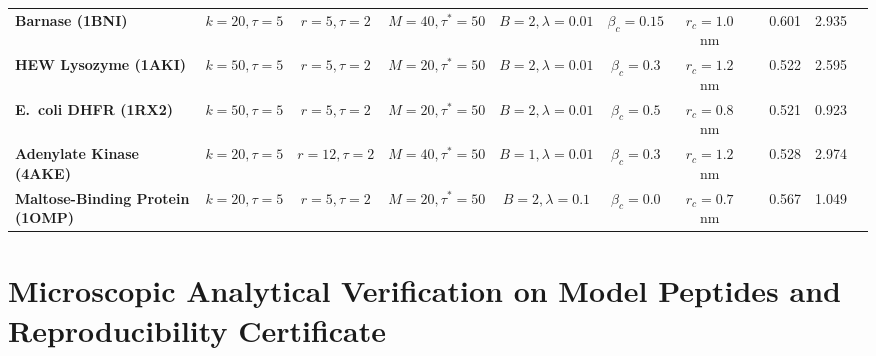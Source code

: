 \documentclass[10pt,letterpaper]{article}
\begin{document}
\begin{table}[!htbp]
{\begin{tabular}{@{}l c c c c c c c c c c@{}}
\textbf{Barnase (1BNI)} & $k=20,\tau=5$ & $r=5,\tau=2$ & $M=40,\tau^*=50$ & $B=2,\lambda=0.01$ & $\beta_c=0.15$ & $r_c=1.0$ nm & \textbf{\vFourSOTAFrobVFourBarnase{}} & 0.601 & 2.935 & \vFourSOTAEntropySdeBarnase{} \\
\textbf{HEW Lysozyme (1AKI)} & $k=50,\tau=5$ & $r=5,\tau=2$ & $M=20,\tau^*=50$ & $B=2,\lambda=0.01$ & $\beta_c=0.3$ & $r_c=1.2$ nm & \textbf{\vFourSOTAFrobVFourLysozyme{}} & 0.522 & 2.595 & \vFourSOTAEntropySdeLysozyme{} \\
\textbf{E.\ coli DHFR (1RX2)} & $k=50,\tau=5$ & $r=5,\tau=2$ & $M=20,\tau^*=50$ & $B=2,\lambda=0.01$ & $\beta_c=0.5$ & $r_c=0.8$ nm & \textbf{\vFourSOTAFrobVFourDhfr{}} & 0.521 & 0.923 & \vFourSOTAEntropySdeDhfr{} \\
\textbf{Adenylate Kinase (4AKE)} & $k=20,\tau=5$ & $r=12,\tau=2$ & $M=40,\tau^*=50$ & $B=1,\lambda=0.01$ & $\beta_c=0.3$ & $r_c=1.2$ nm & \textbf{\vFourSOTAFrobVFourAdk{}} & 0.528 & 2.974 & \vFourSOTAEntropySdeAdk{} \\
\textbf{Maltose-Binding Protein (1OMP)} & $k=20,\tau=5$ & $r=5,\tau=2$ & $M=20,\tau^*=50$ & $B=2,\lambda=0.1$ & $\beta_c=0.0$ & $r_c=0.7$ nm & \textbf{\vFourSOTAFrobVFourMbp{}} & 0.567 & 1.049 & \vFourSOTAEntropySdeMbp{} \\
\bottomrule[1.1pt]
\end{tabular}%
}
\end{table}

\clearpage
\section{Microscopic Analytical Verification on Model Peptides and Reproducibility Certificate}
\end{document}
